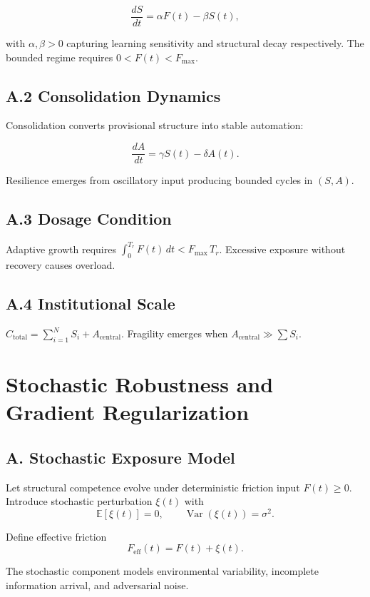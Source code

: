 \documentclass[11pt]{article}
\theoremstyle{remark}
\begin{document}
\[
\frac{dS}{dt} = \alpha F(t) - \beta S(t),
\]

with $\alpha, \beta > 0$ capturing learning sensitivity and structural decay respectively. The bounded regime requires $0 < F(t) < F_{\max}$.

\subsection*{A.2 Consolidation Dynamics}

Consolidation converts provisional structure into stable automation:

\[
\frac{dA}{dt} = \gamma S(t) - \delta A(t).
\]

Resilience emerges from oscillatory input producing bounded cycles in $(S, A)$.

\subsection*{A.3 Dosage Condition}

Adaptive growth requires $\int_0^{T_r} F(t)\,dt < F_{\max}\, T_r$. Excessive exposure without recovery causes overload.

\subsection*{A.4 Institutional Scale}

$C_{\text{total}} = \sum_{i=1}^N S_i + A_{\text{central}}$. Fragility emerges when $A_{\text{central}} \gg \sum S_i$.

\section{Stochastic Robustness and Gradient Regularization}
\label{app:stochastic}

\subsection*{A. Stochastic Exposure Model}

Let structural competence evolve under deterministic friction input $F(t) \geq 0$. Introduce stochastic perturbation $\xi(t)$ with
\[
\mathbb{E}[\xi(t)] = 0,
\qquad
\operatorname{Var}(\xi(t)) = \sigma^2.
\]

Define effective friction
\[
F_{\text{eff}}(t) = F(t) + \xi(t).
\]

The stochastic component models environmental variability, incomplete information arrival, and adversarial noise.
\end{document}
